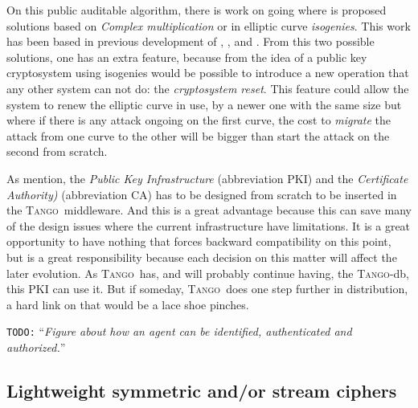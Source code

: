 \documentclass[10pt,a4paper,twoside]{llncs}
\newcommand{\todo}[1]{\texttt{\color{red}TODO:} ``\emph{#1}''}
\newcommand{\tango}{\textsc{Tango}}
\begin{document}
On this public auditable algorithm, there is work on going \cite{secRickShareECs} where is proposed solutions based on \emph{Complex multiplication} or in elliptic curve \emph{isogenies}. This work has been based in previous development of \cite{Ramiro05}, \cite{Rostovtsev06public} \cite{Rosana11}, and \cite{JValera11}. From this two possible solutions, one has an extra feature, because from the idea of a public key cryptosystem using isogenies \cite{Rostovtsev06public} would be possible to introduce a new operation that any other system can not do: the \emph{cryptosystem reset}. This feature could allow the system to renew the elliptic curve in use, by a newer one with the same size but where if there is any attack ongoing on the first curve, the cost to \emph{migrate} the attack from one curve to the other will be bigger than start the attack on the second from scratch.

As mention, the \emph{Public Key Infrastructure} (abbreviation PKI) and the \emph{Certificate Authority)} (abbreviation CA) has to be designed from scratch to be inserted in the \tango\, middleware. And this is a great advantage because this can save many of the design issues where the current infrastructure have limitations. It is a great opportunity to have nothing that forces backward compatibility on this point, but is a great responsibility because each decision on this matter will affect the later evolution. As \tango\, has, and will probably continue having, the \tango-db, this PKI can use it. But if someday, \tango\, does one step further in distribution, a hard link on that would be a lace shoe pinches.

\todo{Figure about how an agent can be identified, authenticated and authorized.}


\subsection{Lightweight symmetric and/or stream ciphers}\label{sec:encryption}
\end{document}
